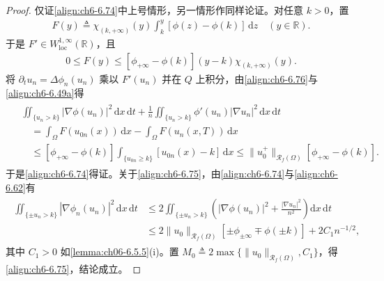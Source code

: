 \documentclass[../../main.tex]{subfiles}%
\begin{document}
\begin{proof}
仅证\eqref{align:ch6-6.74}中上号情形，另一情形作同样论证。对任意 $k>0$，置
\begin{align*}
F(y)\triangleq\chi_{(k,+\infty)}(y)\int_k^y[\phi(z)-\phi(k)]\,\mathrm{d}z\quad(y\in\mathbb{R}).
\end{align*}
于是 $F'\in W^{1,\infty}_{\mathrm{loc}}(\mathbb{R})$，且
\begin{align}
0\leqslant F(y)\leqslant[\phi_{+\infty}-\phi(k)](y-k)\chi_{(k,+\infty)}(y). \label{align:ch6-6.76}
\end{align}
将 $\partial_tu_n=\Delta\phi_n(u_n)$ 乘以 $F'(u_n)$ 并在 $Q$ 上积分，由\eqref{align:ch6-6.76}与\eqref{align:ch6-6.49a}得
\begin{align*}
\begin{aligned}
&\iint_{\{u_n>k\}}|\nabla\phi(u_n)|^2\,\mathrm{d}x\,\mathrm{d}t
+\frac{1}{n}\iint_{\{u_n>k\}}\phi'(u_n)|\nabla u_n|^2\,\mathrm{d}x\,\mathrm{d}t\\
&\quad=\int_\Omega F(u_{0n}(x))\,\mathrm{d}x-\int_\Omega F(u_n(x,T))\,\mathrm{d}x\\
&\quad\leqslant[\phi_{+\infty}-\phi(k)]\int_{\{u_{0n}\geqslant k\}}[u_{0n}(x)-k]\,\mathrm{d}x
\leqslant\|u^+_0\|_{\mathscr{R}_f(\Omega)}[\phi_{+\infty}-\phi(k)].
\end{aligned}
\end{align*}
于是\eqref{align:ch6-6.74}得证。关于\eqref{align:ch6-6.75}，由\eqref{align:ch6-6.74}与\eqref{align:ch6-6.62}有
\begin{align*}
\begin{aligned}
\iint_{\{\pm u_n>k\}}|\nabla\phi_n(u_n)|^2\,\mathrm{d}x\,\mathrm{d}t
&\leqslant2\iint_{\{\pm u_n>k\}}\left(|\nabla\phi(u_n)|^2+\frac{|\nabla u_n|^2}{n^2}\right)\mathrm{d}x\,\mathrm{d}t\\
&\leqslant2\|u_0\|_{\mathscr{R}_f(\Omega)}[\pm\phi_{\pm\infty}\mp\phi(\pm k)]
+2C_1n^{-1/2},
\end{aligned}
\end{align*}
其中 $C_1>0$ 如\cref{lemma:ch06-6.5.5}(i)。置 $M_0\triangleq2\max\{\|u_0\|_{\mathscr{R}_f(\Omega)},C_1\}$，得\eqref{align:ch6-6.75}，结论成立。
\end{proof}
\end{document}
